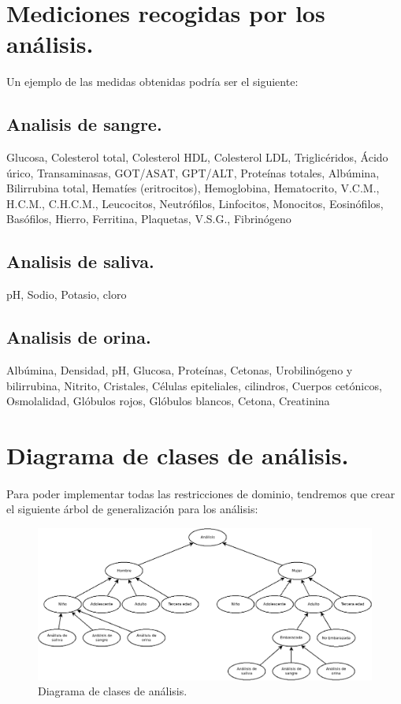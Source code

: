 \documentclass[a4paper,10pt]{article}
\begin{document}
\section{Mediciones recogidas por los análisis.}
Un ejemplo de las medidas obtenidas podría ser el siguiente:
\subsection{Analisis de sangre.}
Glucosa, Colesterol total, Colesterol HDL, Colesterol LDL, Triglicéridos, Ácido úrico, Transaminasas, GOT/ASAT, GPT/ALT, Proteínas totales, Albúmina, Bilirrubina total, Hematíes (eritrocitos), Hemoglobina, Hematocrito, V.C.M., H.C.M., C.H.C.M., Leucocitos, Neutrófilos, Linfocitos, Monocitos, Eosinófilos, Basófilos, Hierro, Ferritina, Plaquetas, V.S.G., Fibrinógeno \subsection{Analisis de saliva.}
pH, Sodio, Potasio, cloro
\subsection{Analisis de orina.}
Albúmina, Densidad, pH, Glucosa, Proteínas, Cetonas, Urobilinógeno y bilirrubina, Nitrito, Cristales, Células epiteliales, cilindros, Cuerpos cetónicos, Osmolalidad, Glóbulos rojos, Glóbulos blancos, Cetona, Creatinina
\pagebreak

\section{Diagrama de clases de análisis.}
\paragraph{}
Para poder implementar todas las restricciones de dominio, tendremos que crear el siguiente árbol de generalización para los análisis:\\
\begin{figure}[hbt]
	\includegraphics[width=\textwidth]{img/analisis.png}
	\caption{Diagrama de clases de análisis.}
	\label{fig:diagramaanalisis}
\end{figure}
\end{document}
